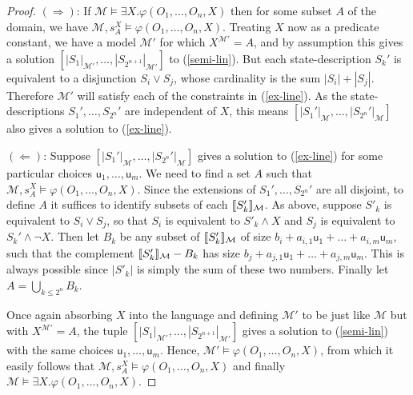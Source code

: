 \documentclass[10pt,a4paper]{amsart}
\newcommand{\semantics}[1]{[\![\mbox{\em $ #1 $\/}]\!]}
\begin{document}
\begin{proof}
$(\Rightarrow)$: If $\mathcal{M} \vDash \exists X. \varphi(O_1,\dots,O_n,X)$ then for some subset $A$ of the domain, we have $\mathcal{M},s^X_A \vDash \varphi(O_1,\dots,O_n,X)$. Treating $X$ now as a predicate constant, we have a model $\mathcal{M}'$ for which $X^{\mathcal{M}'}=A$, and by assumption this gives a solution $[|S_1|_{\mathcal{M}'},\dots,|S_{2^{n+1}}|_{\mathcal{M}'}]$ to (\ref{semi-lin}). But each state-description $S_k'$ is equivalent to a disjunction $S_i \vee S_j$, whose cardinality is the sum $|S_i|+|S_j|$. Therefore $\mathcal{M}'$ will satisfy each of the constraints in (\ref{ex-line}). As the state-descriptions $S_1',\dots,S_{2^n}'$ are independent of $X$, this means  $[|S_1'|_{\mathcal{M}},\dots,|S_{2^n}'|_{\mathcal{M}}]$ also gives a solution to (\ref{ex-line}).

\vspace{1ex}

$(\Leftarrow)$: Suppose $[|S_1'|_{\mathcal{M}},\dots,|S_{2^n}'|_{\mathcal{M}}]$  gives a solution to (\ref{ex-line}) for some particular choices $\mathsf{u}_1,\dots,\mathsf{u}_m$. We need to find a set $A$ such that $\mathcal{M},s^X_A \vDash \varphi(O_1,\dots,O_n,X)$. Since the extensions of $S_1',\dots,S_{2^n}'$ are all disjoint, to define $A$ it suffices to identify subsets of each $\semantics{S_k'}_{\mathcal{M}}$. As above, suppose $S'_k$ is equivalent to $S_i \vee S_j$, so that $S_i$ is equivalent to $S'_k \wedge X$ and $S_j$ is equivalent to $S_k' \wedge \neg X$. Then let $B_k$ be any subset of $\semantics{S_k'}_{\mathcal{M}}$ of size $b_i + a_{i,1}\mathsf{u}_1 + \dots + a_{i,m}\mathsf{u}_m$, such that the complement $\semantics{S'_k}_{\mathcal{M}} - B_k$ has size $b_j + a_{j,1}\mathsf{u}_1 + \dots + a_{j,m}\mathsf{u}_m$. This is always possible since $|S'_k|$ is simply the sum of these two numbers. Finally let $A = \bigcup_{k\leq 2^n} B_k$. 

Once again absorbing $X$ into the language and defining $\mathcal{M}'$ to be just like $\mathcal{M}$ but with $X^{\mathcal{M}'} = A$, the tuple $[|S_1|_{\mathcal{M}'},\dots,|S_{2^{n+1}}|_{\mathcal{M}'}]$ gives a solution to (\ref{semi-lin}) with the same choices $\mathsf{u}_1,\dots,\mathsf{u}_m$. Hence, $\mathcal{M}'\vDash \varphi(O_1,\dots,O_n,X)$, from which it easily follows that $\mathcal{M},s^X_A \vDash \varphi(O_1,\dots,O_n,X)$ and finally $\mathcal{M} \vDash \exists X. \varphi(O_1,\dots,O_n,X)$.
\end{proof}
\end{document}
